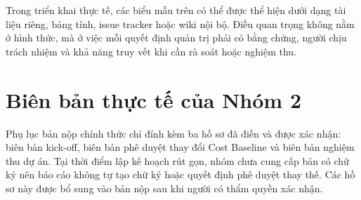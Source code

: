 Trong triển khai thực tế, các biểu mẫu trên có thể được thể hiện dưới dạng tài liệu riêng, bảng tính, issue tracker hoặc wiki nội bộ. Điều quan trọng không nằm ở hình thức, mà ở việc mỗi quyết định quản trị phải có bằng chứng, người chịu trách nhiệm và khả năng truy vết khi cần rà soát hoặc nghiệm thu.
\fi

\section{Biên bản thực tế của Nhóm 2}

Phụ lục bản nộp chính thức chỉ đính kèm ba hồ sơ đã điền và được xác nhận: biên bản kick-off, biên bản phê duyệt thay đổi Cost Baseline và biên bản nghiệm thu dự án. Tại thời điểm lập kế hoạch rút gọn, nhóm chưa cung cấp bản có chữ ký nên báo cáo không tự tạo chữ ký hoặc quyết định phê duyệt thay thế. Các hồ sơ này được bổ sung vào bản nộp sau khi người có thẩm quyền xác nhận.
